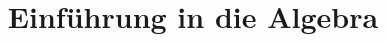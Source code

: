 \title{Einführung in die Algebra}
\pretitle{\pagestyle{empty}\begin{center}  \Huge \bfseries}
	\renewcommand{\maketitlehookb}{\centering \Large  \textit{Vorlesungsmitschriften im Wintersemester 2018/19}}
\date{}